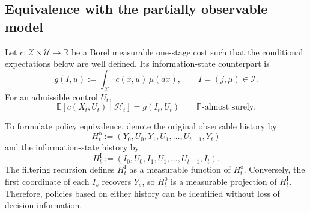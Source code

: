 \documentclass[10pt,twocolumn]{article}
\theoremstyle{remark}
\newcommand{\R}{\mathbb{R}}
\newcommand{\E}{\mathbb{E}}
\newcommand{\Pp}{\mathbb{P}}
\newcommand{\Hh}{\mathcal{H}}
\newcommand{\Ucal}{\mathcal{U}}
\newcommand{\Xcal}{\mathcal{X}}
\newcommand{\Ical}{\mathcal{I}}
\begin{document}
\subsection{Equivalence with the partially observable model}
\label{subsec:pomdp-mdp-equivalence}

Let $c:\Xcal\times\Ucal\to\R$ be a Borel measurable one-stage cost such that the conditional expectations below are well defined. Its information-state counterpart is
\begin{equation}
	g(I,u)
	:=\int_{\Xcal}c(x,u)\,\mu(dx),
	\qquad I=(j,\mu)\in\Ical.
	\label{eq:filtered-one-stage-cost}
\end{equation}
For an admissible control $U_t$,
\begin{equation}
	\E[c(X_t,U_t)\mid\Hh_t]
	=g(I_t,U_t)
	\qquad \Pp\text{-almost surely}.
	\label{eq:conditional-cost-equivalence}
\end{equation}

To formulate policy equivalence, denote the original observable history by
\begin{equation}
	H_t^{\mathrm o}
	:=(Y_0,U_0,Y_1,U_1,\ldots,U_{t-1},Y_t)
	\label{eq:observable-history-vector}
\end{equation}
and the information-state history by
\begin{equation}
	H_t^{\mathrm I}
	:=(I_0,U_0,I_1,U_1,\ldots,U_{t-1},I_t).
	\label{eq:information-history-vector}
\end{equation}
The filtering recursion defines $H_t^{\mathrm I}$ as a measurable function of $H_t^{\mathrm o}$. Conversely, the first coordinate of each $I_s$ recovers $Y_s$, so $H_t^{\mathrm o}$ is a measurable projection of $H_t^{\mathrm I}$. Therefore, policies based on either history can be identified without loss of decision information.
\end{document}
